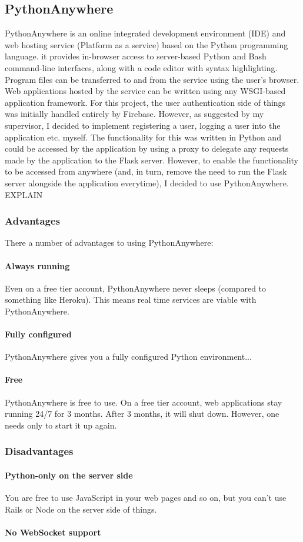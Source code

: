 \subsection{PythonAnywhere}
PythonAnywhere is an online integrated development environment (IDE) and web hosting service (Platform as a service) based on the Python programming language. it provides in-browser access to server-based Python and Bash command-line interfaces, along with a code editor with syntax highlighting. Program files can be transferred to and from the service using the user's browser. Web applications hosted by the service can be written using any WSGI-based application framework. For this project, the user authentication side of things was initially handled entirely by Firebase. However, as suggested by my supervisor, I decided to implement registering a user, logging a user into the application etc. myself. The functionality for this was written in Python and could be accessed by the application by using a proxy to delegate any requests made by the application to the Flask server. However, to enable the functionality to be accessed from anywhere (and, in turn, remove the need to run the Flask server alongside the application everytime), I decided to use PythonAnywhere. EXPLAIN

\subsubsection{Advantages}
There a number of advantages to using PythonAnywhere:

\paragraph{Always running}
Even on a free tier account, PythonAnywhere never sleeps (compared to something like Heroku). This means real time services are viable with PythonAnywhere.

\paragraph{Fully configured}
PythonAnywhere gives you a fully configured Python environment...

\paragraph{Free}
PythonAnywhere is free to use. On a free tier account, web applications stay running 24/7 for 3 months. After 3 months, it will shut down. However, one needs only to start it up again.

\subsubsection{Disadvantages}

\paragraph{Python-only on the server side}
You are free to use JavaScript in your web pages and so on, but you can't use Rails or Node on the server side of things.

\paragraph{No WebSocket support}
